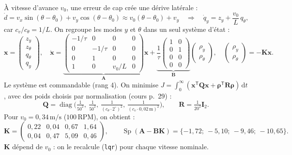 \documentclass[11pt,a4paper]{article}
\newcommand{\SI}[2]{\ensuremath{#1\,\mathrm{#2}}}
\newcommand{\vect}[1]{\boldsymbol{#1}}
\newcommand{\T}{\mathsf{T}}
\begin{document}
À vitesse d'avance $v_0$, une erreur de cap crée une dérive latérale :
\begin{equation}
\dot d=v_x\sin(\theta-\theta_0)+v_y\cos(\theta-\theta_0)\approx v_0(\theta-\theta_0)+v_y
\quad\Longrightarrow\quad
\dot q_y=z_y+\frac{v_0}{L}\,q_\theta ,
\end{equation}
car $c_v/c_\theta=1/L$.
On regroupe les modes $y$ et $\theta$ dans un seul système d'état :
\begin{equation}
\vect x=\begin{pmatrix}z_y\\ z_\theta\\ q_\theta\\ q_y\end{pmatrix},\quad
\dot{\vect x}=
\underbrace{\begin{pmatrix}
-1/\tau & 0 & 0 & 0\\
0 & -1/\tau & 0 & 0\\
0 & 1 & 0 & 0\\
1 & 0 & v_0/L & 0
\end{pmatrix}}_{\vect A}\vect x+
\underbrace{\frac1\tau\begin{pmatrix}1&0\\0&1\\0&0\\0&0\end{pmatrix}}_{\vect B}
\begin{pmatrix}\rho_y\\ \rho_\theta\end{pmatrix},
\quad
\begin{pmatrix}\rho_y\\ \rho_\theta\end{pmatrix}=-\vect K\vect x .
\end{equation}
Le système est commandable (rang 4).
On minimise $J=\int_0^\infty(\vect x^\T\vect Q\vect x+\vect\rho^\T\vect R\vect\rho)\,\mathrm dt$,
avec des poids choisis par normalisation (cours p.~29) :
\begin{equation}
\vect Q=\operatorname{diag}\!\Big(\tfrac1{50^2},\ \tfrac1{50^2},\ \tfrac1{(c_\theta\cdot2^\circ)^2},\ \tfrac1{(c_v\cdot\SI{0{,}02}{m})^2}\Big),
\qquad \vect R=\tfrac1{20^2}\vect I_2 .
\end{equation}
Pour $v_0=\SI{0{,}34}{m/s}$ (\SI{100}{RPM}), on obtient :
\begin{equation}
\vect K=\begin{pmatrix}0{,}22 & 0{,}04 & 0{,}67 & 1{,}64\\ 0{,}04 & 0{,}47 & 5{,}09 & 0{,}46\end{pmatrix},
\qquad
\operatorname{Sp}(\vect A-\vect B\vect K)=\{-1{,}72;\ -5{,}10;\ -9{,}46;\ -10{,}65\}.
\end{equation}
$\vect K$ dépend de $v_0$ : on le recalcule (\texttt{lqr}) pour chaque vitesse nominale.
\end{document}
